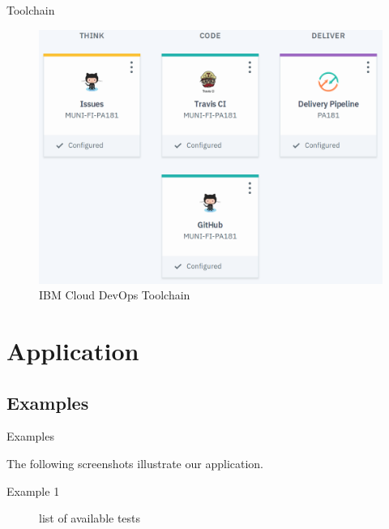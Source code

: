 \documentclass[]{beamer}
\begin{document}
    \begin{frame}{Toolchain}
      \begin{figure}[H]
        \includegraphics[width=.75\textwidth,height=.75\textheight,keepaspectratio]{img/toolchain.png}
        \caption{IBM Cloud DevOps Toolchain}
      \end{figure}
    \end{frame}

\section[Application]{Application}

  \subsection{Examples}

    \begin{frame}{Examples}
      \vspace{7.5mm}
      \centerline{The following screenshots illustrate our application.}
    \end{frame}

    \begin{frame}{Example 1}
      \begin{figure}
        \caption{list of available tests}
      \end{figure}
    \end{frame}
\end{document}
